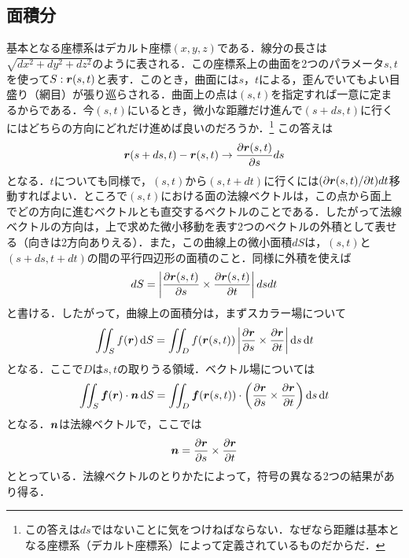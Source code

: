 \documentclass[a4paper,10pt,uplatex]{jsarticle}
\begin{document}
\subsection{面積分}
基本となる座標系はデカルト座標$(x,y,z)$である．線分の長さは$\sqrt{dx^2+dy^2+dz^2}$のように表される．この座標系上の曲面を2つのパラメータ$s,t$を使って$S:\vb*{r}(s,t)$と表す．このとき，曲面には$s$，$t$による，歪んでいてもよい目盛り（網目）が張り巡らされる．曲面上の点は$(s,t)$を指定すれば一意に定まるからである．今$(s,t)$にいるとき，微小な距離だけ進んで$(s+ds,t)$に行くにはどちらの方向にどれだけ進めば良いのだろうか．\footnote{この答えは$ds$ではないことに気をつけねばならない．なぜなら距離は基本となる座標系（デカルト座標系）によって定義されているものだからだ．}
この答えは
\begin{equation}
    \vb*{r}(s+ds,t) - \vb*{r}(s,t) \to \pdv{\vb*{r}(s,t)}{s} ds
\end{equation}
となる．$t$についても同様で，$(s,t)$から$(s,t+dt)$に行くには$(\partial\vb*{r}(s,t)/\partial t)dt$移動すればよい．ところで$(s,t)$における面の法線ベクトルは，この点から面上でどの方向に進むベクトルとも直交するベクトルのことである．したがって法線ベクトルの方向は，上で求めた微小移動を表す2つのベクトルの外積として表せる（向きは2方向ありえる）．また，この曲線上の微小面積$dS$は，$(s,t)$と$(s+ds,t+dt)$の間の平行四辺形の面積のこと．同様に外積を使えば
\begin{equation}
    dS = \left|\pdv{\vb*{r}(s,t)}{s} \times \pdv{\vb*{r}(s,t)}{t}\right|dsdt
\end{equation}
と書ける．したがって，曲線上の面積分は，まずスカラー場について
\begin{equation}
    \iint_S f(\vb*{r}) \dd{S} = \iint_D f(\vb*{r}(s,t)) \left|\pdv{\vb*{r}}{s} \times \pdv{\vb*{r}}{t}\right|\dd{s}\dd{t}
\end{equation}
となる．ここで$D$は$s,t$の取りうる領域．ベクトル場については
\begin{equation}
    \iint_S \vb*{f}(\vb*{r}) \cdot \vb*{n} \dd{S} = \iint_D \vb*{f}(\vb*{r}(s,t)) \cdot \left( \pdv{\vb*{r}}{s} \times \pdv{\vb*{r}}{t}\right) \dd{s}\dd{t}
\end{equation}
となる．$\vb*{n}$は法線ベクトルで，ここでは
\begin{equation}
    \vb*{n} = \pdv{\vb*{r}}{s} \times \pdv{\vb*{r}}{t}
\end{equation}
ととっている．法線ベクトルのとりかたによって，符号の異なる2つの結果があり得る．
\end{document}
